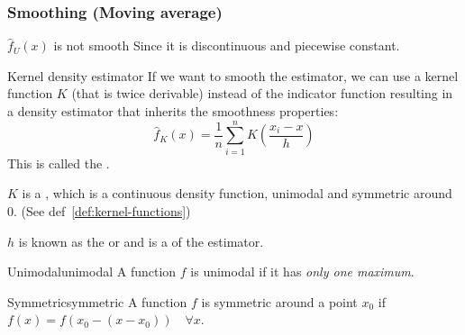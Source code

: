 \pagebreak
\subsubsection{Smoothing (Moving average)}
\begin{prop}{$\widehat{f}_U(x)$ is not smooth}{}
	Since it is discontinuous and piecewise constant.
\end{prop}
\begin{definition}{Kernel density estimator}{}
	If we want to smooth the estimator, we can use a kernel function $K$ (that is twice derivable) instead
	of the indicator function resulting in a density estimator that inherits the
	smoothness properties:
	\begin{equation}
		\widehat{f}_K(x) = \frac{1}{n}\sum_{i=1}^n K\left( \frac{x_i - x}{h} \right)
		\tag{kernel density estimator}
	\end{equation}
	This is called the .
	\tcblower

	$K$ is a , which is a continuous density function, unimodal
	and symmetric around $0$. (See def~\ref{def:kernel-functions})

	$h$ is known as the  or  and is a
	 of the estimator.
\end{definition}

\begin{definition}{Unimodal}{unimodal}
	A function $f$ is unimodal if it has \emph{only one maximum}.
\end{definition}

\begin{definition}{Symmetric}{symmetric}
	A function $f$ is symmetric around a point $x_0$ if $f(x) = f(x_0 - (x - x_0)) \quad \forall x$.
\end{definition}

